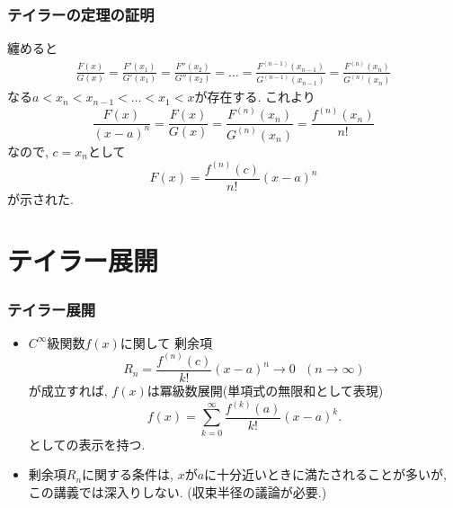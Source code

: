 \begin{frame}
\frametitle{テイラーの定理の証明}

纏めると
\begin{align*}
\frac{F(x)}{G(x)}=\frac{F'(x_1)}{G'(x_1)}
=\frac{F''(x_2)}{G''(x_2)}=\dots =\frac{F^{(n-1)}(x_{n-1})}{G^{(n-1)}(x_{n-1})}=\frac{F^{(n)}(x_{n})}{G^{(n)}(x_{n})}
\end{align*}
なる$a<x_{n}<x_{n-1}<\dots<x_1<x$が存在する. 
これより
$$
\frac{F(x)}{(x-a)^n}=\frac{F(x)}{G(x)}=\frac{F^{(n)}(x_{n})}{G^{(n)}(x_{n})}=\frac{f^{(n)}(x_n)}{n!}
$$
なので, $c=x_n$として
$$
F(x)=\frac{f^{(n)}(c)}{n!}(x-a)^n
$$
が示された. 

\end{frame}





\section{テイラー展開}

\begin{frame}
\frametitle{テイラー展開}


\begin{itemize}
\item $C^\infty$級関数$f(x)$に関して
剰余項
$$
R_n=\frac{f^{(n)}(c)}{k!}(x-a)^n \rightarrow 0 \ \ \ (n \rightarrow \infty)
$$
が成立すれば, $f(x)$は冪級数展開(単項式の無限和として表現)
$$
f(x) = \sum_{k=0}^{\infty}\frac{f^{(k)}(a)}{k!}(x-a)^k. 
$$
としての表示を持つ.  
\item 剰余項$R_n$に関する条件は, $x$が$a$に十分近いときに満たされることが多いが, この講義では深入りしない. (収束半径の議論が必要.)
\end{itemize}

\end{frame}





